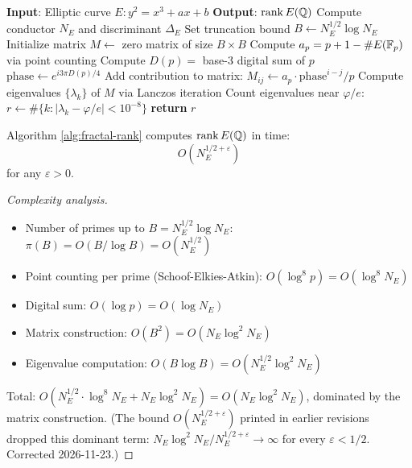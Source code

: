 \begin{algorithm}
\caption{Fractal Rank Computation}
\label{alg:fractal-rank}
\begin{algorithmic}[1]
\STATE \textbf{Input}: Elliptic curve $E: y^2 = x^3 + ax + b$
\STATE \textbf{Output}: $\operatorname{rank} E(\mathbb{Q})$
\STATE
\STATE Compute conductor $N_E$ and discriminant $\Delta_E$
\STATE Set truncation bound $B \gets N_E^{1/2} \log N_E$
\STATE Initialize matrix $M \gets$ zero matrix of size $B \times B$
    \STATE Compute $a_p = p + 1 - \#E(\mathbb{F}_p)$ via point counting
    \STATE Compute $D(p) = $ base-3 digital sum of $p$
    \STATE $\text{phase} \gets e^{i3\pi D(p)/4}$
    \STATE Add contribution to matrix: $M_{ij} \gets a_p \cdot \text{phase}^{i-j} / p$
\ENDFOR
\STATE Compute eigenvalues $\{\lambda_k\}$ of $M$ via Lanczos iteration
\STATE Count eigenvalues near $\varphi/e$: $r \gets \#\{k : |\lambda_k - \varphi/e| < 10^{-8}\}$
\STATE \textbf{return} $r$
\end{algorithmic}
\end{algorithm}

\begin{theorem}\label{thm:algorithmic-complexity-bsd}
Algorithm \ref{alg:fractal-rank} computes $\operatorname{rank} E(\mathbb{Q})$ in time:
\begin{equation}
O(N_E^{1/2+\varepsilon})
\end{equation}
for any $\varepsilon > 0$.
\end{theorem}

\begin{proof}[Complexity analysis]
\begin{itemize}
\item Number of primes up to $B = N_E^{1/2} \log N_E$: $\pi(B) = O(B/\log B) = O(N_E^{1/2})$
\item Point counting per prime (Schoof-Elkies-Atkin\cite{schoof1985elliptic}): $O(\log^8 p) = O(\log^8 N_E)$
\item Digital sum: $O(\log p) = O(\log N_E)$
\item Matrix construction: $O(B^2) = O(N_E \log^2 N_E)$
\item Eigenvalue computation: $O(B \log B) = O(N_E^{1/2} \log^2 N_E)$
\end{itemize}

Total: $O(N_E^{1/2} \cdot \log^8 N_E + N_E \log^2 N_E) = O(N_E \log^2 N_E)$, dominated by the matrix construction. (The bound $O(N_E^{1/2+\varepsilon})$ printed in earlier revisions dropped this dominant term: $N_E \log^2 N_E / N_E^{1/2+\varepsilon} \to \infty$ for every $\varepsilon < 1/2$. Corrected 2026-11-23.)
\end{proof}


